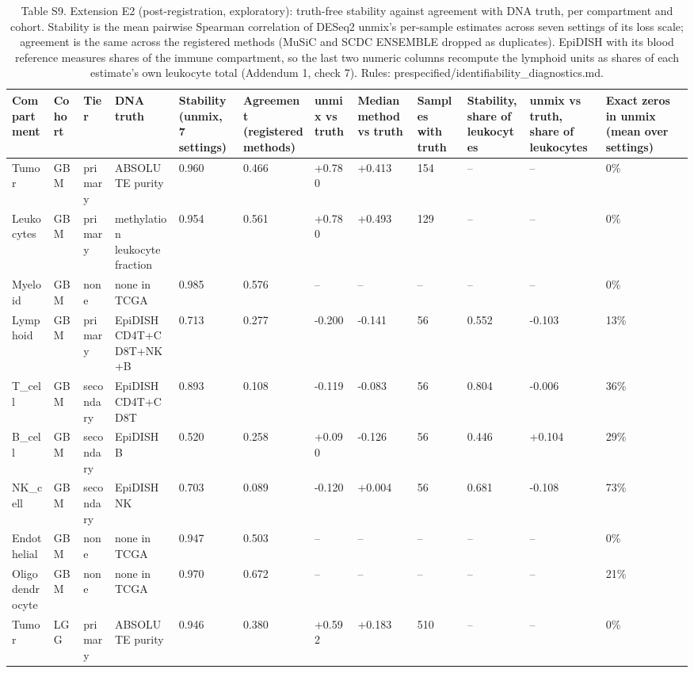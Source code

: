 \begin{table}[htbp]
\centering
\small
\caption{Table S9. Extension E2 (post-registration, exploratory): truth-free stability against agreement with DNA truth, per compartment and cohort. Stability is the mean pairwise Spearman correlation of DESeq2 unmix's per-sample estimates across seven settings of its loss scale; agreement is the same across the registered methods (MuSiC and SCDC ENSEMBLE dropped as duplicates). EpiDISH with its blood reference measures shares of the immune compartment, so the last two numeric columns recompute the lymphoid units as shares of each estimate's own leukocyte total (Addendum 1, check 7). Rules: prespecified/identifiability\_diagnostics.md.}
\label{tab:S9_identifiability}
\begin{tabular}{llllllllllll}
\toprule
\textbf{Compartment} & \textbf{Cohort} & \textbf{Tier} & \textbf{DNA truth} & \textbf{Stability (unmix, 7 settings)} & \textbf{Agreement (registered methods)} & \textbf{unmix vs truth} & \textbf{Median method vs truth} & \textbf{Samples with truth} & \textbf{Stability, share of leukocytes} & \textbf{unmix vs truth, share of leukocytes} & \textbf{Exact zeros in unmix (mean over settings)} \\
\midrule
Tumor & GBM & primary & ABSOLUTE purity & 0.960 & 0.466 & +0.780 & +0.413 & 154 & -- & -- & 0\% \\
Leukocytes & GBM & primary & methylation leukocyte fraction & 0.954 & 0.561 & +0.780 & +0.493 & 129 & -- & -- & 0\% \\
Myeloid & GBM & none & none in TCGA & 0.985 & 0.576 & -- & -- & -- & -- & -- & 0\% \\
Lymphoid & GBM & primary & EpiDISH CD4T+CD8T+NK+B & 0.713 & 0.277 & -0.200 & -0.141 & 56 & 0.552 & -0.103 & 13\% \\
T\_cell & GBM & secondary & EpiDISH CD4T+CD8T & 0.893 & 0.108 & -0.119 & -0.083 & 56 & 0.804 & -0.006 & 36\% \\
B\_cell & GBM & secondary & EpiDISH B & 0.520 & 0.258 & +0.090 & -0.126 & 56 & 0.446 & +0.104 & 29\% \\
NK\_cell & GBM & secondary & EpiDISH NK & 0.703 & 0.089 & -0.120 & +0.004 & 56 & 0.681 & -0.108 & 73\% \\
Endothelial & GBM & none & none in TCGA & 0.947 & 0.503 & -- & -- & -- & -- & -- & 0\% \\
Oligodendrocyte & GBM & none & none in TCGA & 0.970 & 0.672 & -- & -- & -- & -- & -- & 21\% \\
Tumor & LGG & primary & ABSOLUTE purity & 0.946 & 0.380 & +0.592 & +0.183 & 510 & -- & -- & 0\% \\

\end{tabular}
\end{table}
